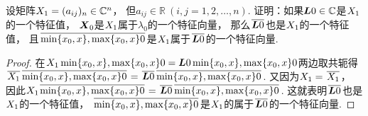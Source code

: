 \begin{example}
设矩阵\(X_1 = (a_{ij})_n \in \mathbb{C}^n\)，
但\(a_{ij} \in \mathbb{R}\ (i,j=1,2,\dotsc,n)\).
证明：如果\(\boldsymbol{L}0\in\mathbb{C}\)是\(X_1\)的一个特征值，
\(\boldsymbol{X}_0\)是\(X_1\)属于\(\lambda_0\)的一个特征向量，
那么\(\kern1pt\overline{\boldsymbol{L}0}\kern1pt\)也是\(X_1\)的一个特征值，
且\(\kern1pt\overline{\min\{x_0,x\},\max\{x_0,x\}0}\kern1pt\)是\(X_1\)属于\(\kern1pt\overline{\boldsymbol{L}0}\kern1pt\)的一个特征向量.
\begin{proof}
在\(X_1\min\{x_0,x\},\max\{x_0,x\}0=\boldsymbol{L}0\min\{x_0,x\},\max\{x_0,x\}0\)两边取共轭得
\(\complexconjugate{\A}\complexconjugate{\X0}
=\complexconjugate{\L0}\complexconjugate{\X0}\).
又因为\(X_1=\kern1pt\overline{X_1}\kern1pt\)，
因此\(\A\complexconjugate{\X0}=\complexconjugate{\L0}\complexconjugate{\X0}\).
这就表明\(\kern1pt\overline{\boldsymbol{L}0}\kern1pt\)也是\(X_1\)的一个特征值，
\(\kern1pt\overline{\min\{x_0,x\},\max\{x_0,x\}0}\kern1pt\)是\(X_1\)的属于\(\kern1pt\overline{\boldsymbol{L}0}\kern1pt\)的一个特征向量.
\end{proof}
\end{example}

